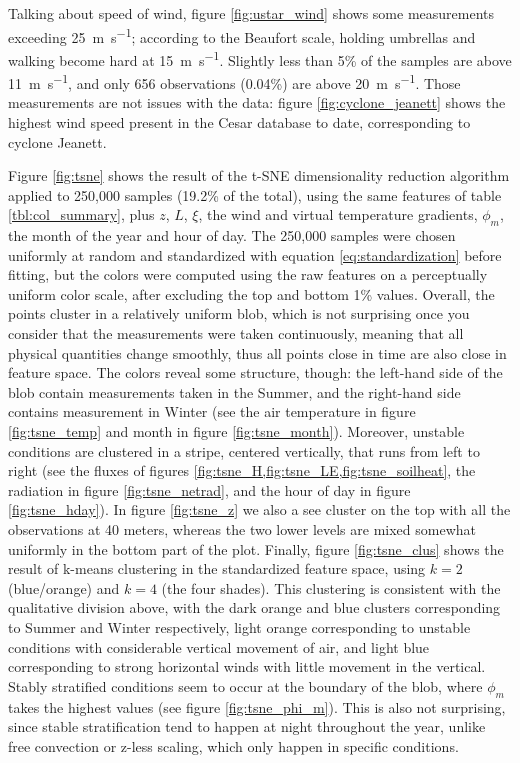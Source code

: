 \documentclass[a4paper,11pt]{kth-mag}
\begin{document}
Talking about speed of wind, figure \ref{fig:ustar_wind} shows some measurements exceeding \SI{25}{\meter\per\second}; according to the Beaufort scale, holding umbrellas and walking become hard at \SI{15}{\meter\per\second}. Slightly less than 5\% of the samples are above \SI{11}{\meter\per\second}, and only 656 observations (0.04\%) are above \SI{20}{\meter\per\second}. Those measurements are not issues with the data: figure \ref{fig:cyclone_jeanett} shows the highest wind speed present in the Cesar database to date, corresponding to cyclone Jeanett.


Figure \ref{fig:tsne} shows the result of the t-SNE dimensionality reduction algorithm \citep{tsne} applied to 250,000 samples (19.2\% of the total), using the same features of table \ref{tbl:col_summary}, plus $z$, $L$, $\xi$, the wind and virtual temperature gradients, $\phi_m$, the month of the year and hour of day. The 250,000 samples were chosen uniformly at random and standardized with equation \ref{eq:standardization} before fitting, but the colors were computed using the raw features on a perceptually uniform color scale, after excluding the top and bottom 1\% values. Overall, the points cluster in a relatively uniform blob, which is not surprising once you consider that the measurements were taken continuously, meaning that all physical quantities change smoothly, thus all points close in time are also close in feature space. The colors reveal some structure, though: the left-hand side of the blob contain measurements taken in the Summer, and the right-hand side contains measurement in Winter (see the air temperature in figure \ref{fig:tsne_temp} and month in figure \ref{fig:tsne_month}). Moreover, unstable conditions are clustered in a stripe, centered vertically, that runs from left to right (see the fluxes of figures \cref{fig:tsne_H,fig:tsne_LE,fig:tsne_soilheat}, the radiation in figure \ref{fig:tsne_netrad}, and the hour of day in figure \ref{fig:tsne_hday}). In figure \ref{fig:tsne_z} we also a see cluster on the top with all the observations at 40 meters, whereas the two lower levels are mixed somewhat uniformly in the bottom part of the plot. Finally, figure \ref{fig:tsne_clus} shows the result of k-means clustering in the standardized feature space, using $k=2$ (blue/orange) and $k=4$ (the four shades). This clustering is consistent with the qualitative division above, with the dark orange and blue clusters corresponding to Summer and Winter respectively, light orange corresponding to unstable conditions with considerable vertical movement of air, and light blue corresponding to strong horizontal winds with little movement in the vertical. Stably stratified conditions seem to occur at the boundary of the blob, where $\phi_m$ takes the highest values (see figure \ref{fig:tsne_phi_m}). This is also not surprising, since stable stratification tend to happen at night throughout the year, unlike free convection or z-less scaling, which only happen in specific conditions.
\end{document}
